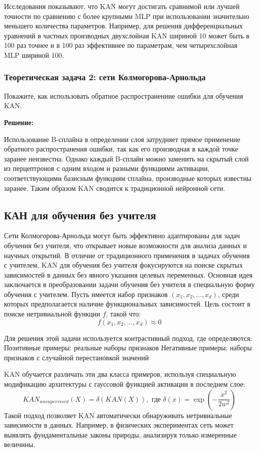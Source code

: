 Исследования показывают, что KAN могут достигать сравнимой или лучшей точности по сравнению с более крупными MLP при использовании значительно меньшего количества параметров. Например, для решения дифференциальных уравнений в частных производных двухслойная KAN шириной 10 может быть в 100 раз точнее и в 100 раз эффективнее по параметрам, чем четырехслойная MLP шириной 100.

\subsubsection{Теоретическая задача 2: сети Колмогорова-Арнольда}
Покажите, как использовать обратное распространениие ошибки для обучения KAN.

\textbf{Решение:}

Использование B-сплайна в определении слоя затрудняет прямое применение обратного распространения ошибки, так как его производная в каждой точке заранее неизвестна. Однако каждый B-сплайн можно заменить на скрытый слой из перцептронов с одним входом и разными функциями активации, соответствующими базисным функциям сплайна, производные которых известны заранее. Таким образом KAN сводится к традиционной нейронной сети.

\subsection{КАН для обучения без учителя}

Сети Колмогорова-Арнольда могут быть эффективно адаптированы для задач обучения без учителя, что открывает новые возможности для анализа данных и научных открытий. В отличие от традиционного применения в задачах обучения с учителем, KAN для обучения без учителя фокусируются на поиске скрытых зависимостей в данных без явного указания целевых переменных.
Основная идея заключается в преобразовании задачи обучения без учителя в специальную форму обучения с учителем. Пусть имеется набор признаков $(x_1, x_2, ..., x_d)$, среди которых предполагается наличие функциональных зависимостей. Цель состоит в поиске нетривиальной функции $f$, такой что:
\[
f(x_1, x_2, ..., x_d) \approx 0
\]

Для решения этой задачи используется контрастивный подход, где определяются:
Позитивные примеры: реальные наборы признаков
Негативные примеры: наборы признаков с случайной перестановкой значений

KAN обучается различать эти два класса примеров, используя специальную модификацию архитектуры с гауссовой функцией активации в последнем слое:
\[
KAN_{unsupervised}(X) = \delta (KAN(X)), \text{ где } \delta(x) = \exp(-\frac{x^2}{2w^2})
\]
Такой подход позволяет KAN автоматически обнаруживать нетривиальные зависимости в данных. Например, в физических экспериментах сеть может выявлять фундаментальные законы природы, анализируя только измеренные величины.

